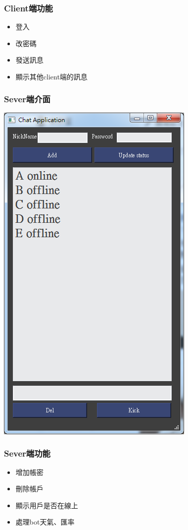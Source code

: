 \documentclass[utf8x]{beamer}
\begin{document}
\begin{frame}[t]
\frametitle{\huge Client端功能} %
\begin{itemize}
\Large \item 登入
\item 改密碼
\item 發送訊息
\item 顯示其他client端的訊息
\end{itemize}
\end{frame}

\begin{frame}
\frametitle{\huge Sever端介面} %
\hspace{3.4cm} \includegraphics[scale=0.32]{serverui}
\end{frame}

\begin{frame}[t]
\frametitle{\huge Sever端功能} %
\begin{itemize}
\Large \item 增加帳密
\item 刪除帳戶
\item 顯示用戶是否在線上
\item 處理bot天氣、匯率
\end{itemize}
\end{frame}
\end{document}
